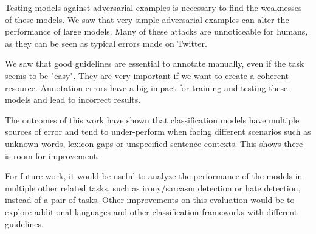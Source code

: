 \documentclass[11pt,a4paper]{article}
\begin{document}
Testing models against adversarial examples is necessary to find the weaknesses of these models. We saw that very simple adversarial examples can alter the performance of large models. Many of these attacks are unnoticeable for humans, as they can be seen as typical errors made on Twitter.

We saw that good guidelines are essential to annotate manually, even if the task seems to be "easy". They are very important if we want to create a coherent resource. Annotation errors have a big impact for training and testing these models and lead to incorrect results.

The outcomes of this work have shown that classification models have multiple sources of error and tend to under-perform when facing different scenarios such as unknown words, lexicon gaps or unspecified sentence contexts. This shows there is room for improvement. 

For future work, it would be useful to analyze the performance of the models in multiple other related tasks, such as irony/sarcasm detection or hate detection, instead of a pair of tasks. Other improvements on this evaluation would be to explore additional languages and other classification frameworks with different guidelines.



\end{document}
